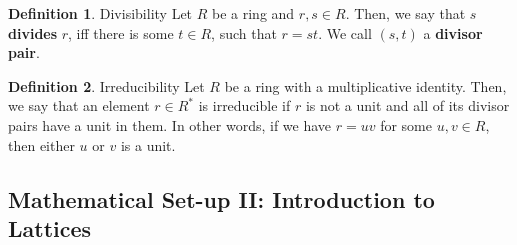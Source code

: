 \documentclass{article}
\theoremstyle{definition}
\newtheorem{definition}{Definition}[section]
\theoremstyle{example}
\begin{document}
\begin{definition}{Divisibility}
  Let $R$ be a ring and $r, s \in R$. Then, we say that $s$ \textbf{divides}
  $r$, iff there is some $t \in R$, such that $r = st$. We call $(s,t)$ a
  \textbf{divisor pair}.
\end{definition}
\begin{definition}{Irreducibility}
  Let $R$ be a ring with a multiplicative identity. Then, we say that an element
  $r \in R^*$ is irreducible if $r$ is not a unit and all of its divisor pairs have a unit in them. In other
  words, if we have $r = uv$ for some $u, v \in R$, then either $u$ or $v$ is a unit.
\end{definition}
\subsection{Mathematical Set-up II: Introduction to Lattices}
\label{sec:lattice_intro}
\end{document}
